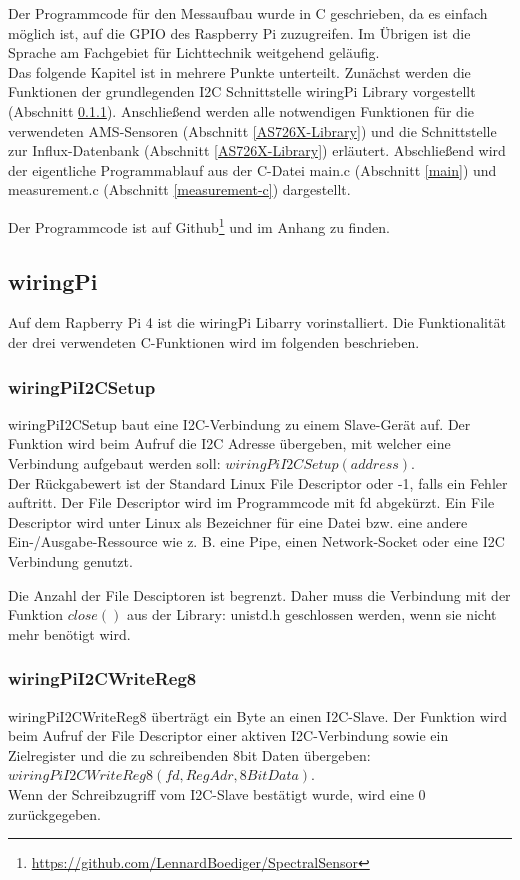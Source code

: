 Der Programmcode für den Messaufbau wurde in C geschrieben, da es einfach möglich ist, auf die GPIO des Raspberry Pi zuzugreifen. Im Übrigen ist die Sprache am Fachgebiet für Lichttechnik weitgehend geläufig.\\
Das folgende Kapitel ist in mehrere Punkte unterteilt. Zunächst werden die Funktionen der grundlegenden I2C Schnittstelle wiringPi Library vorgestellt (Abschnitt \ref{wiringPiI2CSetup}). Anschließend werden alle notwendigen Funktionen für die verwendeten AMS-Sensoren (Abschnitt \ref{AS726X-Library}) und die Schnittstelle zur Influx-Datenbank (Abschnitt \ref{AS726X-Library}) erläutert.
Abschließend wird der eigentliche Programmablauf aus der C-Datei main.c (Abschnitt \ref{main}) und measurement.c (Abschnitt \ref{measurement-c}) dargestellt.

\noindent Der Programmcode ist auf Github\footnote{\url{https://github.com/LennardBoediger/SpectralSensor}} und im Anhang zu finden.


\subsection{wiringPi}
Auf dem Rapberry Pi 4 ist die  wiringPi Libarry vorinstalliert. 
Die Funktionalität der drei verwendeten C-Funktionen wird im folgenden beschrieben.

\subsubsection{wiringPiI2CSetup}\label{wiringPiI2CSetup}
wiringPiI2CSetup baut eine I2C-Verbindung zu einem Slave-Gerät auf.
Der Funktion wird beim Aufruf die I2C Adresse übergeben, mit welcher eine Verbindung aufgebaut werden soll: $wiringPiI2CSetup(address)$.\\
Der Rückgabewert ist der Standard Linux File Descriptor oder -1, falls ein Fehler auftritt. 
Der File Descriptor wird im Programmcode mit fd abgekürzt.
Ein File Descriptor wird unter Linux als Bezeichner für eine Datei bzw. eine andere Ein-/Ausgabe-Ressource wie z. B. eine Pipe, einen Network-Socket oder eine I2C Verbindung genutzt.

Die Anzahl der File Desciptoren ist begrenzt. Daher muss die Verbindung mit der Funktion $close()$ aus der Library: unistd.h geschlossen werden, wenn sie nicht mehr benötigt wird.

\subsubsection{wiringPiI2CWriteReg8}
wiringPiI2CWriteReg8 überträgt ein Byte an einen I2C-Slave.
Der Funktion wird beim Aufruf der File Descriptor einer aktiven I2C-Verbindung sowie ein Zielregister und die zu schreibenden 8bit Daten übergeben:\\ $wiringPiI2CWriteReg8 (fd, RegAdr, 8BitData)$.\\
Wenn der Schreibzugriff vom I2C-Slave bestätigt wurde, wird eine 0 zurückgegeben.

